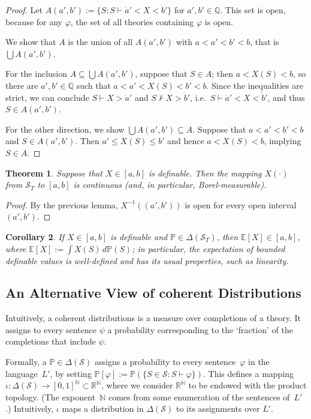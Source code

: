 \documentclass[12pt]{article}
\newcommand{\PP}{\mathbb{P}}
\newcommand{\vp}{\varphi}
\newcommand{\EE}{\mathbb{E}}
\newcommand{\RR}{\mathbb{R}}
\newcommand{\NN}{\mathbb{N}}
\newcommand{\QQ}{\mathbb{Q}}
\newcommand{\cL}{L'}
\newcommand{\cS}{\mathcal{S}}
\theoremstyle{plain}
\newtheorem{theorem}{Theorem}[subsection]
\newtheorem{corollary}[theorem]{Corollary}
\theoremstyle{definition}
\theoremstyle{remark}
\begin{document}
\begin{proof}
Let $A(a',b') := \{S : S\vdash\dot a' < X < \dot b'\}$ for $a',b'\in\QQ$. 
This set is open, because for any $\vp$, the set of all theories containing $\vp$ is open. 

We show that $A$ is the union of all $A(a',b')$ with $a < a' < b' < b$, that is $\bigcup A(a',b')$.

For the inclusion $A \subseteq \bigcup A(a',b')$, suppose that $S\in A$; then $a < X(S) < b$, so there are $a',b'\in\QQ$ such that $a<a'<X(S)<b'<b$.
Since the inequalities are strict, we can conclude $S\vdash X > \dot a'$ and $S\nvdash X > \dot b'$, i.e.\ $S\vdash\dot a' < X < \dot b'$, and thus $S\in A(a',b')$.

For the other direction, we show $\bigcup A(a',b')\subseteq A$. 
Suppose that $a < a' < b' < b$ and $S\in A(a',b')$.
Then $a' \le X(S) \le b'$ and hence $a < X(S) < b$, implying $S\in A$.
\end{proof}
\begin{theorem}
Suppose that $X\in[a,b]$ is definable. Then the mapping $X(\cdot)$ from $\cS_T$ to $[a,b]$ is continuous (and, in particular, Borel-measurable).
\end{theorem}
\begin{proof}
By the previous lemma, $X^{-1}((a',b'))$ is open for every open interval $(a',b')$.

\end{proof}
\begin{corollary}
If $X\in[a,b]$ is definable and $\PP\in\Delta(\cS_T)$, then $\EE[X]\in[a,b]$, where $\EE[X] := \int X(S)\,d\PP(S)$; in particular, the expectation of bounded definable values is well-defined and has its usual properties, such as linearity.
\end{corollary}
\subsection{An Alternative View of coherent Distributions} \label{An Alternative View of coherent Distributions}
Intuitively, a coherent distributions is a measure over completions of a theory. 
It assigns to every sentence $\psi$ a probability corresponding to the `fraction' of the completions that include $\psi$.

Formally, a $\PP\in\Delta(\cS)$ assigns a probability to every sentence~$\vp$ in the language~$\cL$, by setting $\PP[\vp] := \PP(\{S\in\cS:S\vdash\vp\})$. 
This defines a mapping $\iota : \Delta(\cS)\to [0,1]^\NN\subset\RR^\NN$, where we consider $\RR^\NN$ to be endowed with the product topology. 
(The exponent~$\NN$ comes from some enumeration of the sentences of~$\cL$.)
Intuitively, $\iota$ maps a distribution in $\Delta(\cS)$ to its assignments over $\cL$.
\end{document}
